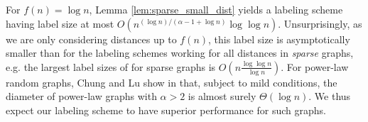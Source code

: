 For $f(n) = \log n$, Lemma \ref{lem:sparse_small_dist} yields a labeling scheme having label size
at most $O\left(n^{(\log n)/(\alpha - 1 + \log n)} \log\log n \right)$. Unsurprisingly, as we are only considering distances up
to $f(n)$, this label size is asymptotically smaller than for the labeling
schemes working for all distances in \emph{sparse} graphs, e.g. the largest label sizes of \cite{DBLP:journals/corr/GawrychowskiKU15} for sparse graphs is $O(n \frac{\log \log n}{ \log n})$.
For power-law random graphs, Chung and Lu show in \cite{chung2004average} that, subject to mild conditions, the diameter of power-law graphs with $\alpha > 2$ is almost surely $\Theta(\log n)$. We thus expect our labeling scheme to have
superior performance for such graphs.
